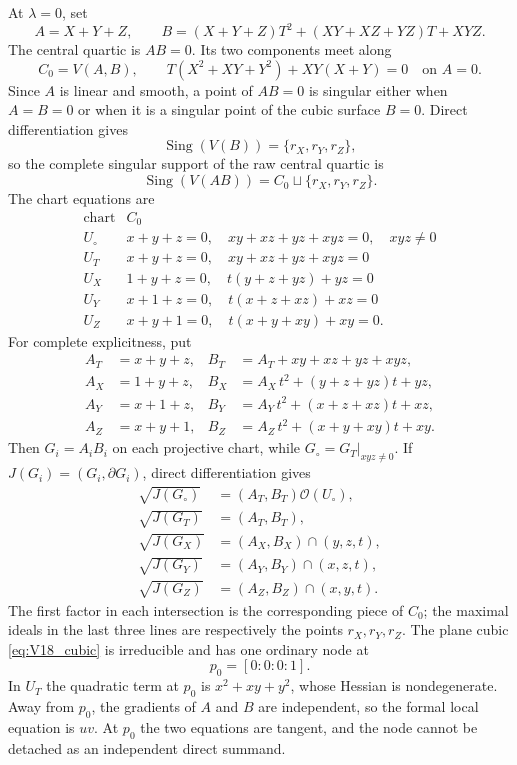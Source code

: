 \documentclass[11pt]{amsart}
\theoremstyle{definition}
\theoremstyle{remark}
\DeclareMathOperator{\Sing}{Sing}
\begin{document}
At $\lambda=0$, set
\[
A=X+Y+Z,
\qquad
B=(X+Y+Z)T^2+(XY+XZ+YZ)T+XYZ.
\]
The central quartic is $AB=0$.  Its two components meet along
\begin{equation}
\label{eq:V18_cubic}
C_0=V(A,B),
\qquad
T(X^2+XY+Y^2)+XY(X+Y)=0
\quad\text{on }A=0.
\end{equation}
Since $A$ is linear and smooth, a point of $AB=0$ is singular either when
$A=B=0$ or when it is a singular point of the cubic surface $B=0$.  Direct
differentiation gives
\[
\Sing(V(B))=\{r_X,r_Y,r_Z\},
\]
so the complete singular support of the raw central quartic is
\[
\Sing(V(AB))=C_0\sqcup\{r_X,r_Y,r_Z\}.
\]
The chart equations are
\[
\begin{array}{c|c}
\text{chart}&C_0\\ \hline
U_\circ&x+y+z=0,\quad xy+xz+yz+xyz=0,\quad xyz\neq0\\
U_T&x+y+z=0,\quad xy+xz+yz+xyz=0\\
U_X&1+y+z=0,\quad t(y+z+yz)+yz=0\\
U_Y&x+1+z=0,\quad t(x+z+xz)+xz=0\\
U_Z&x+y+1=0,\quad t(x+y+xy)+xy=0.
\end{array}
\]
For complete explicitness, put
\begin{align*}
A_T&=x+y+z,
&B_T&=A_T+xy+xz+yz+xyz,\\
A_X&=1+y+z,
&B_X&=A_X\,t^2+(y+z+yz)t+yz,\\
A_Y&=x+1+z,
&B_Y&=A_Y\,t^2+(x+z+xz)t+xz,\\
A_Z&=x+y+1,
&B_Z&=A_Z\,t^2+(x+y+xy)t+xy.
\end{align*}
Then $G_i=A_iB_i$ on each projective chart, while
$G_\circ=G_T|_{xyz\neq0}$.  If $J(G_i)=(G_i,\partial G_i)$, direct
differentiation gives
\begin{align}
\sqrt{J(G_\circ)}&=(A_T,B_T)\mathcal O(U_\circ),
\label{eq:V18_jacobian_torus}\\
\sqrt{J(G_T)}&=(A_T,B_T),
\label{eq:V18_jacobian_T}\\
\sqrt{J(G_X)}&=(A_X,B_X)\cap(y,z,t),
\label{eq:V18_jacobian_X}\\
\sqrt{J(G_Y)}&=(A_Y,B_Y)\cap(x,z,t),
\label{eq:V18_jacobian_Y}\\
\sqrt{J(G_Z)}&=(A_Z,B_Z)\cap(x,y,t).
\label{eq:V18_jacobian_Z}
\end{align}
The first factor in each intersection is the corresponding piece of $C_0$;
the maximal ideals in the last three lines are respectively the points
$r_X,r_Y,r_Z$.
The plane cubic \eqref{eq:V18_cubic} is irreducible and has one ordinary node
at
\[
p_0=[0:0:0:1].
\]
In $U_T$ the quadratic term at $p_0$ is $x^2+xy+y^2$, whose Hessian is
nondegenerate.  Away from $p_0$, the gradients of $A$ and $B$ are independent,
so the formal local equation is $uv$.  At $p_0$ the two equations are tangent,
and the node cannot be detached as an independent direct summand.
\end{document}
